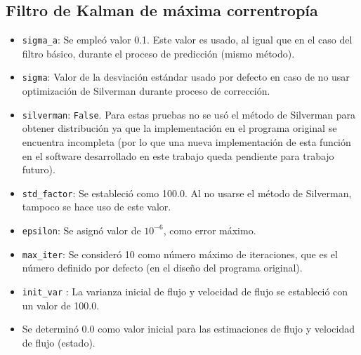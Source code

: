 \subsection*{Filtro de Kalman de m\'axima correntrop\'ia}
\begin{itemize}
\item \texttt{sigma\_a}: Se emple\'o valor 0.1. Este valor es usado, al igual que en el caso del filtro b\'asico, durante el proceso de predicci\'on (mismo m\'etodo).
\item \texttt{sigma}: Valor de la desviaci\'on est\'andar usado por defecto en caso de no usar optimizaci\'on de Silverman durante proceso de correcci\'on.
\item \texttt{silverman}: \texttt{False}. Para estas pruebas no se us\'o el m\'etodo de Silverman para obtener distribuci\'on ya que la implementaci\'on en el programa original se encuentra incompleta (por lo que una nueva implementaci\'on de esta funci\'on en el software desarrollado en este trabajo queda pendiente para trabajo futuro). 
\item \texttt{std\_factor}: Se estableci\'o como 100.0. Al no usarse el m\'etodo de Silverman, tampoco se hace uso de este valor.
\item \texttt{epsilon}: Se asign\'o valor de $10^{-6}$, como error m\'aximo. 
\item \texttt{max\_iter}: Se consider\'o 10 como n\'umero m\'aximo de iteraciones, que es el n\'umero definido por defecto (en el dise\~no del programa original).  
\item \texttt{init\_var} : La varianza inicial de flujo y velocidad de flujo se estableci\'o con un valor de 100.0.
\item Se determin\'o 0.0 como valor inicial para las estimaciones de flujo y velocidad de flujo (estado).

\end{itemize}
